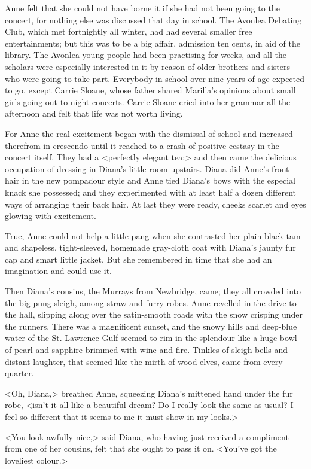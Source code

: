 Anne felt that she could not have borne it if she had not been going to the concert, for nothing else was discussed that day in school. The Avonlea Debating Club, which met fortnightly all winter, had had several smaller free entertainments; but this was to be a big affair, admission ten cents, in aid of the library. The Avonlea young people had been practising for weeks, and all the scholars were especially interested in it by reason of older brothers and sisters who were going to take part. Everybody in school over nine years of age expected to go, except Carrie Sloane, whose father shared Marilla's opinions about small girls going out to night concerts. Carrie Sloane cried into her grammar all the afternoon and felt that life was not worth living.

For Anne the real excitement began with the dismissal of school and increased therefrom in crescendo until it reached to a crash of positive ecstasy in the concert itself. They had a <perfectly elegant tea;> and then came the delicious occupation of dressing in Diana's little room upstairs. Diana did Anne's front hair in the new pompadour style and Anne tied Diana's bows with the especial knack she possessed; and they experimented with at least half a dozen different ways of arranging their back hair. At last they were ready, cheeks scarlet and eyes glowing with excitement.

True, Anne could not help a little pang when she contrasted her plain black tam and shapeless, tight-sleeved, homemade gray-cloth coat with Diana's jaunty fur cap and smart little jacket. But she remembered in time that she had an imagination and could use it.

Then Diana's cousins, the Murrays from Newbridge, came; they all crowded into the big pung sleigh, among straw and furry robes. Anne revelled in the drive to the hall, slipping along over the satin-smooth roads with the snow crisping under the runners. There was a magnificent sunset, and the snowy hills and deep-blue water of the St. Lawrence Gulf seemed to rim in the splendour like a huge bowl of pearl and sapphire brimmed with wine and fire. Tinkles of sleigh bells and distant laughter, that seemed like the mirth of wood elves, came from every quarter.

<Oh, Diana,> breathed Anne, squeezing Diana's mittened hand under the fur robe, <isn't it all like a beautiful dream? Do I really look the same as usual? I feel so different that it seems to me it must show in my looks.>

<You look awfully nice,> said Diana, who having just received a compliment from one of her cousins, felt that she ought to pass it on. <You've got the loveliest colour.>

